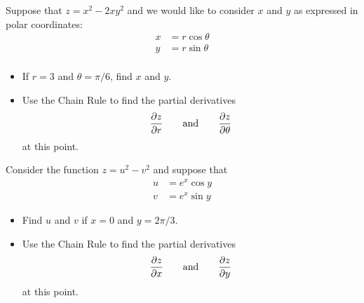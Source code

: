 \begin{activity} \label{PA:10.12} 
  \ba
  \item Suppose that $z=x^2 - 2xy^2$ and we would like to consider $x$
    and $y$ as expressed in polar coordinates:
    \begin{align*}
      x&=r\cos\theta \\
      y&=r\sin\theta \\
    \end{align*}
    \begin{itemize}
      \item If $r = 3$ and $\theta=\pi/6$, find $x$ and $y$.
      \item Use the Chain Rule to find the partial derivatives
        $$
        \frac{\partial z}{\partial r}
        \hspace*{20pt}
        \mbox{and}
        \hspace*{20pt}
        \frac{\partial z}{\partial \theta}
        $$
        at this point.
    \end{itemize}
      
  \item Consider the function $z = u^2 - v^2$ and suppose that
    \begin{align*}
      u & = e^x\cos y \\
      v & = e^x\sin y
    \end{align*}
    
    \begin{itemize}
      \item Find $u$ and $v$ if $x=0$ and $y=2\pi/3$.
      \item Use the Chain Rule to find the partial derivatives
        $$
        \frac{\partial z}{\partial x}
        \hspace*{20pt}
        \mbox{and}
        \hspace*{20pt}
        \frac{\partial z}{\partial y}
        $$
        at this point.
    \end{itemize}
      


  \ea

\end{activity} 
\afterpa 
